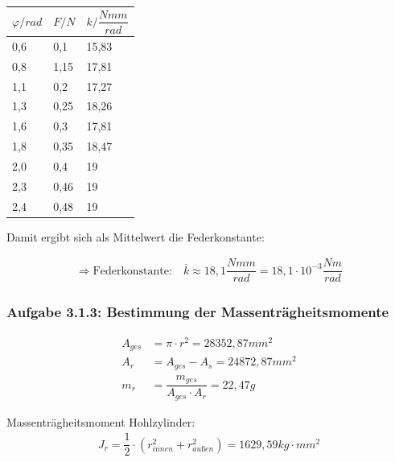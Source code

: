 \documentclass[a4paper]{scrartcl}
\numberwithin{equation}{subsection}
\begin{document}
\begin{table}[H]
\begin{tabular}{|l|l|l|}
\hline
\textbf{$\varphi/rad$} & \textbf{$F/N$} & \textbf{$k/\dfrac{Nmm}{rad}$} \\ \hline
0,6                    & 0,1            & 15,83                         \\ \hline
0,8                    & 1,15           & 17,81                         \\ \hline
1,1                    & 0,2            & 17,27                         \\ \hline
1,3                    & 0,25           & 18,26                         \\ \hline
1,6                    & 0,3            & 17,81                         \\ \hline
1,8                    & 0,35           & 18,47                         \\ \hline
2,0                    & 0,4            & 19                            \\ \hline
2,3                    & 0,46           & 19                            \\ \hline
2,4                    & 0,48           & 19                            \\ \hline
\end{tabular}
\centering
\end{table}

Damit ergibt sich als Mittelwert die Federkonstante:

\begin{align*}
\Rightarrow \text{Federkonstante:} \quad \overline{k} \approx 18,1 \dfrac{Nmm}{rad} = 18,1 \cdot 10^{-3} \dfrac{Nm}{rad}
\end{align*}

\subsubsection{Aufgabe 3.1.3: Bestimmung der Massenträgheitsmomente}

\begin{align}
A_{ges} &= \pi \cdot r^2 = 28352,87mm^2 \\
A_r &= A_{ges} - A_s = 24872,87mm^2 \\
m_r &= \dfrac{m_{ges}}{A_{ges} \cdot A_r} = 22,47g
\end{align}

Massenträgheitsmoment Hohlzylinder:
\begin{align}
J_r = \dfrac{1}{2} \cdot (r_{\textit{innen}}^2 + r_{\textit{außen}}^2) = 1629,59 kg \cdot mm^2
\end{align}
\end{document}
